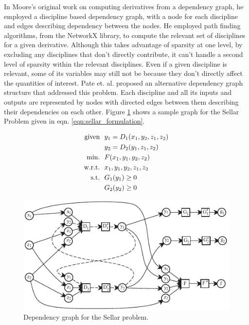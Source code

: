 \documentclass[]{aiaa-tc} %
\newcommand{\txt}{\textrm}
\begin{document}
    In Moore's original work on computing derivatives from a dependency graph, he employed 
    a discipline based dependency graph, with a node for each discipline and edges describing 
    dependency between the nodes. He employed path finding algorithms, from the NetworkX library\cite{hagberg-2008-exploring}, 
    to compute the relevant set of disciplines for a given derivative. Although this takes advantage of sparsity at 
    one level, by excluding any disciplines that don't directly contribute, it can't handle a second level of sparsity 
    within the relevant disciplines. Even if a given discipline is relevant, some of its variables may still not be 
    because they don't directly affect the quantities of interest. Pate et. al. proposed an alternative dependency graph 
    structure that addressed this problem\cite{graph_problem2013}. Each discipline and all its inputs and outputs are
    represented by nodes with directed edges between them describing their dependencies on each other.
    Figure \ref{fig:sellar_graph} shows a sample graph for the Sellar Problem \cite{AIAA:sellar}
    given in eqn. \ref{eqn:sellar_formulation}. 

    \begin{align}
        \txt{given} & \ \ y_1 = D_1(x_1,y_2,z_1,z_2) \notag
        \\      & \ \ y_2 = D_2(y_1,z_1,z_2) \notag
        \\\txt{min.} &\ \ F(x_1,y_1,y_2,z_2) \notag
        \\\txt{w.r.t.} & \ \ x_1,y_1,y_2,z_1,z_2 \notag
        \\\txt{s.t.} & \ \ G_1(y_1) \geq 0 \notag
        \\     & \ \ G_2(y_2) \geq 0
        \label{eqn:sellar_formulation}
    \end{align}

    \begin{figure}[!htb]\begin{center}
      \includegraphics[width=.8\textwidth]{images/sellar_cycles}
      \caption{ Dependency graph for the Sellar problem. \label{fig:sellar_graph}}
    \end{center}\end{figure}
\end{document}
